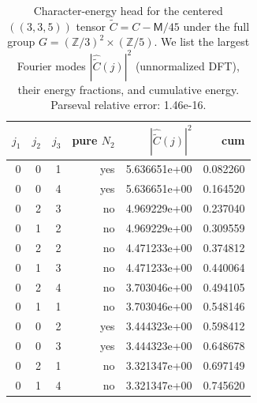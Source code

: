 \begin{table}[H]
\centering
\scriptsize
\setlength{\tabcolsep}{6pt}
\caption{Character-energy head for the centered $((3,3,5))$ tensor $\widetilde C=C-\mathsf{M}/45$ under the full group $G=(\mathbb{Z}/3)^2\times(\mathbb{Z}/5)$. We list the largest Fourier modes $|\widehat{\widetilde C}(j)|^2$ (unnormalized DFT), their energy fractions, and cumulative energy. Parseval relative error: 1.46e-16.}
\label{tab:arity_335_character_energy_head}
\begin{tabular}{r r r r r r}
\toprule
$j_1$ & $j_2$ & $j_3$ & pure $N_2$ & $|\widehat{\widetilde C}(j)|^2$ & cum\\
\midrule
0 & 0 & 1 & yes & 5.636651e+00 & 0.082260\\
0 & 0 & 4 & yes & 5.636651e+00 & 0.164520\\
0 & 2 & 3 & no & 4.969229e+00 & 0.237040\\
0 & 1 & 2 & no & 4.969229e+00 & 0.309559\\
0 & 2 & 2 & no & 4.471233e+00 & 0.374812\\
0 & 1 & 3 & no & 4.471233e+00 & 0.440064\\
0 & 2 & 4 & no & 3.703046e+00 & 0.494105\\
0 & 1 & 1 & no & 3.703046e+00 & 0.548146\\
0 & 0 & 2 & yes & 3.444323e+00 & 0.598412\\
0 & 0 & 3 & yes & 3.444323e+00 & 0.648678\\
0 & 2 & 1 & no & 3.321347e+00 & 0.697149\\
0 & 1 & 4 & no & 3.321347e+00 & 0.745620\\
\bottomrule
\end{tabular}
\end{table}
